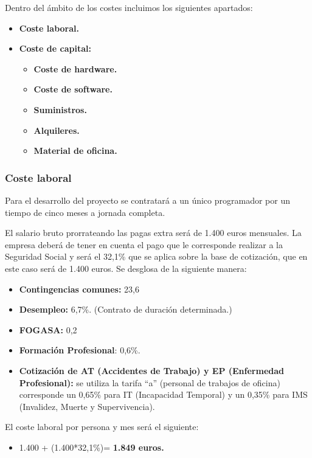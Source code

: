 Dentro del ámbito de los costes incluimos los siguientes apartados:
\begin{itemize}
	\item \textbf{Coste laboral.}
	\item \textbf{Coste de capital:}
	\begin{itemize}
		\item \textbf{Coste de hardware.}
		\item \textbf{Coste de software.}
		\item \textbf{Suministros.}
		\item \textbf{Alquileres.}
		\item \textbf{Material de oficina.}
	\end{itemize}
\end{itemize}		
		
\subsubsection{Coste laboral}

Para el desarrollo del proyecto se contratará a un único programador por un tiempo de cinco meses a jornada completa.

El salario bruto prorrateando las pagas extra será de 1.400 euros mensuales. La empresa deberá de tener en cuenta el pago que le corresponde realizar a la Seguridad Social y será el 32,1\% que se aplica sobre la base de cotización, que en este caso será de 1.400 euros. Se desglosa de la siguiente manera:

\begin{itemize}
	\item \textbf{Contingencias comunes:} 23,6%
	\item \textbf{Desempleo:} 6,7\%. (Contrato de duración determinada.)
	\item \textbf{FOGASA:} 0,2%
	\item \textbf{Formación Profesional}: 0,6\%.
	\item \textbf{Cotización de AT (Accidentes de Trabajo) y EP (Enfermedad Profesional):} se utiliza la tarifa “a” (personal de trabajos de oficina) corresponde un 0,65\% para IT (Incapacidad Temporal) y un 0,35\% para IMS (Invalidez, Muerte y Supervivencia).

\end{itemize}

El coste laboral por persona y mes será el siguiente:

\begin{itemize}
	\item 1.400 + (1.400*32,1\%)= \textbf{1.849 euros.}
\end{itemize}

